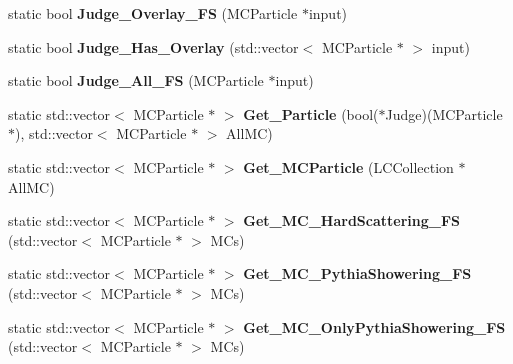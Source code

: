\begin{DoxyCompactItemize}
\item 
\hypertarget{classToolSet_1_1CMC_af61adfde1923ee0bd54f91e88c806c94}{
static bool {\bfseries Judge\_\-Overlay\_\-FS} (MCParticle $\ast$input)}
\label{classToolSet_1_1CMC_af61adfde1923ee0bd54f91e88c806c94}

\item 
\hypertarget{classToolSet_1_1CMC_a257af2810ec961f3e1a71f29bc12154f}{
static bool {\bfseries Judge\_\-Has\_\-Overlay} (std::vector$<$ MCParticle $\ast$ $>$ input)}
\label{classToolSet_1_1CMC_a257af2810ec961f3e1a71f29bc12154f}

\item 
\hypertarget{classToolSet_1_1CMC_a0cdd75e73a26f294c140f9cf2ed196ea}{
static bool {\bfseries Judge\_\-All\_\-FS} (MCParticle $\ast$input)}
\label{classToolSet_1_1CMC_a0cdd75e73a26f294c140f9cf2ed196ea}

\item 
\hypertarget{classToolSet_1_1CMC_ae5e3cc992d63d6efb8030bdb170b87d1}{
static std::vector$<$ MCParticle $\ast$ $>$ {\bfseries Get\_\-Particle} (bool($\ast$Judge)(MCParticle $\ast$), std::vector$<$ MCParticle $\ast$ $>$ AllMC)}
\label{classToolSet_1_1CMC_ae5e3cc992d63d6efb8030bdb170b87d1}

\item 
\hypertarget{classToolSet_1_1CMC_aec3000cf58c5ef65b62938decced8303}{
static std::vector$<$ MCParticle $\ast$ $>$ {\bfseries Get\_\-MCParticle} (LCCollection $\ast$AllMC)}
\label{classToolSet_1_1CMC_aec3000cf58c5ef65b62938decced8303}

\item 
\hypertarget{classToolSet_1_1CMC_a899d324f086d12abb75db9d87798ed91}{
static std::vector$<$ MCParticle $\ast$ $>$ {\bfseries Get\_\-MC\_\-HardScattering\_\-FS} (std::vector$<$ MCParticle $\ast$ $>$ MCs)}
\label{classToolSet_1_1CMC_a899d324f086d12abb75db9d87798ed91}

\item 
\hypertarget{classToolSet_1_1CMC_a321f55fa02ad6ed18931bc906b2e19ee}{
static std::vector$<$ MCParticle $\ast$ $>$ {\bfseries Get\_\-MC\_\-PythiaShowering\_\-FS} (std::vector$<$ MCParticle $\ast$ $>$ MCs)}
\label{classToolSet_1_1CMC_a321f55fa02ad6ed18931bc906b2e19ee}

\item 
\hypertarget{classToolSet_1_1CMC_aea4e69e23c45ca6ac4674ee90d56fc1c}{
static std::vector$<$ MCParticle $\ast$ $>$ {\bfseries Get\_\-MC\_\-OnlyPythiaShowering\_\-FS} (std::vector$<$ MCParticle $\ast$ $>$ MCs)}
\label{classToolSet_1_1CMC_aea4e69e23c45ca6ac4674ee90d56fc1c}


\end{DoxyCompactItemize}
